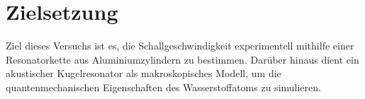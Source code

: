\section{Zielsetzung}
\label{sec:zielsetzung}

Ziel dieses Versuchs ist es, die Schallgeschwindigkeit experimentell mithilfe einer Resonatorkette aus Aluminiumzylindern zu bestimmen. 
Darüber hinaus dient ein akustischer Kugelresonator als makroskopisches Modell, um die quantenmechanischen Eigenschaften des Wasserstoffatoms zu simulieren.
